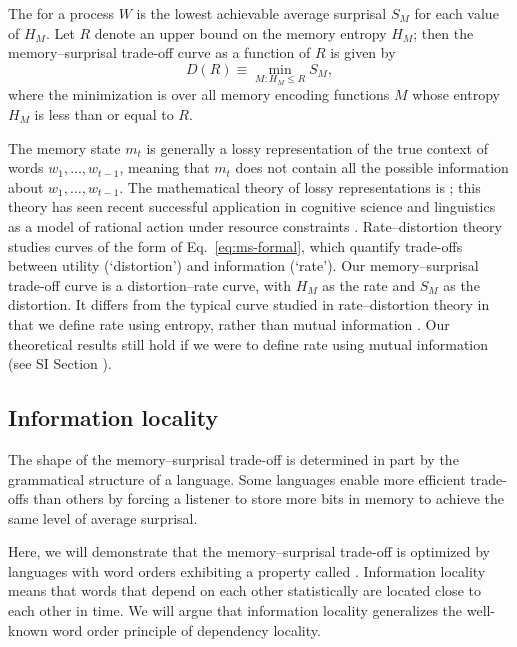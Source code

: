 \begin{definition}
The  for a process $W$ is the lowest achievable average surprisal $S_M$ for each value of $H_M$. Let $R$ denote an upper bound on the memory entropy $H_M$; then the memory--surprisal trade-off curve as a function of $R$ is given by
\begin{equation}
    \label{eq:ms-formal}
    D(R) \equiv \min_{M : H_M \le R} S_M,
\end{equation}
where the minimization is over all memory encoding functions $M$ whose entropy $H_M$ is less than or equal to $R$.
\end{definition}

The memory state $m_t$ is generally a lossy representation of the true context of words $w_1, \dots, w_{t-1}$, meaning that $m_t$ does not contain all the possible information about $w_1, \dots, w_{t-1}$. The mathematical theory of lossy representations is  \citep[for an overview and key results, see][pp. 301--347]{cover2006elements}; this theory has seen recent successful application in cognitive science and linguistics as a model of rational action under resource constraints \citep{sims,gershman,zaslavsky2018efficient}. Rate--distortion theory studies curves of the form of Eq.~\ref{eq:ms-formal}, which quantify trade-offs between utility (`distortion') and information (`rate'). Our memory--surprisal trade-off curve is a distortion--rate curve, with $H_M$ as the rate and $S_M$ as the distortion. It differs from the typical curve studied in rate--distortion theory in that we define rate using entropy, rather than mutual information \citep[see][for a discussion of some of the consequences of this formulation]{strouse-deterministic-2017}. 
Our theoretical results still hold if we were to define rate using mutual information (see SI Section \REF).


\subsection{Information locality}
\label{sec:infoloc}

The shape of the memory--surprisal trade-off is determined in part by the grammatical structure of a language.
Some languages enable more efficient trade-offs than others by forcing a listener to store more bits in memory to achieve the same level of average surprisal.

Here, we will demonstrate that the memory--surprisal trade-off is optimized by languages with word orders exhibiting a property called . Information locality means that words that depend on each other statistically are located close to each other in time. We will argue that information locality generalizes the well-known word order principle of dependency locality.

